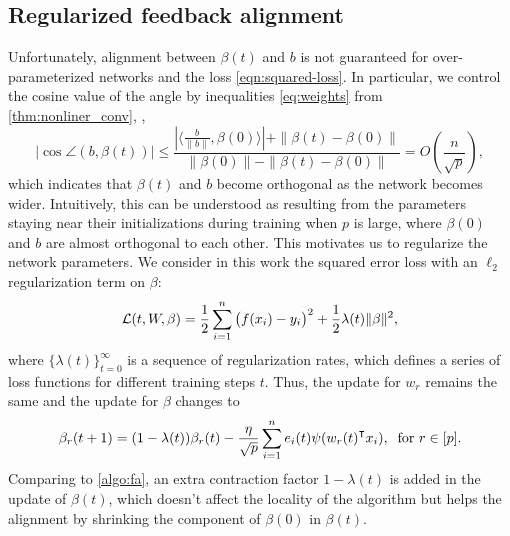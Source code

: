 \subsection{Regularized feedback alignment}
Unfortunately, alignment between $\beta(t)$ and $b$ is not guaranteed for over-parameterized networks and the loss \eqref{eqn:squared-loss}. In particular,  we control the cosine value of the angle by inequalities \eqref{eq:weights} from \cref{thm:nonliner_conv}, \ie,
\begin{equation*}
    \Big|\cos\angle(b, \beta(t))\Big| \leq \frac{|\langle \frac{b}{\|b\|}, \beta(0)\rangle|+ \|\beta(t)- \beta(0)\|}{\|\beta(0)\|-\|\beta(t)-\beta(0)\|} = O\left(\frac{n}{\sqrt p}\right),
\end{equation*}
which indicates that $\beta(t)$ and $b$ become orthogonal as the network becomes wider. Intuitively, this can be understood as resulting from the parameters staying near their initializations during training when $p$ is large, where $\beta(0)$ and $b$ are almost orthogonal to each other. This motivates us to regularize the network parameters. We consider in this work the squared error loss with an $\ell_2$ regularization term on $\beta$:
\begin{equation}
\label{eqn:loss-with-reg}
\mathcal{L}(t, W, \beta) = \frac{1}{2}\sum_{i=1}^n\big(f(x_i)-y_i\big)^2 + \frac{1}{2}\lambda(t)\|\beta\|^2,
\end{equation}
where $\{\lambda(t)\}_{t=0}^\infty$ is a sequence of regularization rates, which defines a series of loss functions for different training steps $t$.
Thus, the update for $w_r$ remains the same and the
update for $\beta$ changes to
$$\beta_r(t+1) = (1-\lambda(t))\beta_r(t) - \frac{\eta}{\sqrt p} \sum_{i=1}^n e_i(t)\psi(w_r(t)\transpose x_i), \;\;\mbox{for $r\in[p]$.}$$
Comparing to \cref{algo:fa}, an extra contraction factor $1-\lambda(t)$ is added in the update of $\beta(t)$, which doesn't affect the locality of the algorithm but helps the alignment by shrinking the component of $\beta(0)$ in $\beta(t)$.


